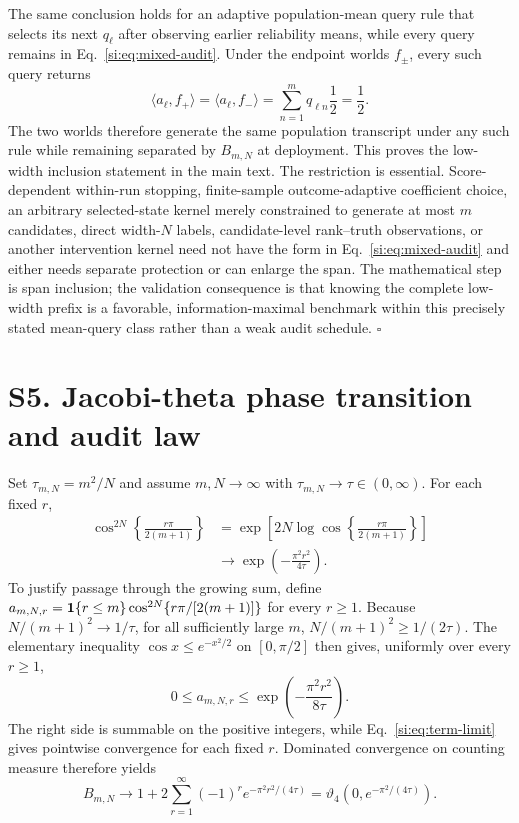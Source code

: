 The same conclusion holds for an adaptive population-mean query rule that selects its next $q_\ell$ after observing earlier reliability means, while every query remains in Eq.~\ref{si:eq:mixed-audit}. Under the endpoint worlds $f_\pm$, every such query returns
\begin{equation}
\langle a_\ell,f_+\rangle
=\langle a_\ell,f_-\rangle
=\sum_{n=1}^m q_{\ell n}\frac12
=\frac12.
\label{si:eq:sequential-transcript}
\end{equation}
The two worlds therefore generate the same population transcript under any such rule while remaining separated by $B_{m,N}$ at deployment. This proves the low-width inclusion statement in the main text. The restriction is essential. Score-dependent within-run stopping, finite-sample outcome-adaptive coefficient choice, an arbitrary selected-state kernel merely constrained to generate at most $m$ candidates, direct width-$N$ labels, candidate-level rank--truth observations, or another intervention kernel need not have the form in Eq.~\ref{si:eq:mixed-audit} and either needs separate protection or can enlarge the span. The mathematical step is span inclusion; the validation consequence is that knowing the complete low-width prefix is a favorable, information-maximal benchmark within this precisely stated mean-query class rather than a weak audit schedule. \hfill$\square$

\section*{S5. Jacobi-theta phase transition and audit law}

Set $\tau_{m,N}=m^2/N$ and assume $m,N\to\infty$ with $\tau_{m,N}\to\tau\in(0,\infty)$. For each fixed $r$,
\begin{align}
\cos^{2N}\!\left\{\frac{r\pi}{2(m+1)}\right\}
&=\exp\left[2N\log\cos\left\{\frac{r\pi}{2(m+1)}\right\}\right]\nonumber\\
&\longrightarrow \exp\left(-\frac{\pi^2r^2}{4\tau}\right).
\label{si:eq:term-limit}
\end{align}
To justify passage through the growing sum, define
$a_{m,N,r}=\mathbf 1\{r\le m\}\cos^{2N}\{r\pi/[2(m+1)]\}$ for every
$r\ge1$. Because $N/(m+1)^2\to1/\tau$, for all sufficiently large $m$,
$N/(m+1)^2\ge1/(2\tau)$. The elementary inequality
$\cos x\le e^{-x^2/2}$ on $[0,\pi/2]$ then gives, uniformly over every
$r\ge1$,
\begin{equation}
0\le a_{m,N,r}
\le \exp\left(-\frac{\pi^2r^2}{8\tau}\right).
\label{si:eq:theta-envelope}
\end{equation}
The right side is summable on the positive integers, while
Eq.~\ref{si:eq:term-limit} gives pointwise convergence for each fixed $r$.
Dominated convergence on counting measure therefore yields
\begin{equation}
B_{m,N}\longrightarrow
1+2\sum_{r=1}^\infty(-1)^r
e^{-\pi^2r^2/(4\tau)}
=\vartheta_4\!\left(0,e^{-\pi^2/(4\tau)}\right).
\label{si:eq:theta4}
\end{equation}

